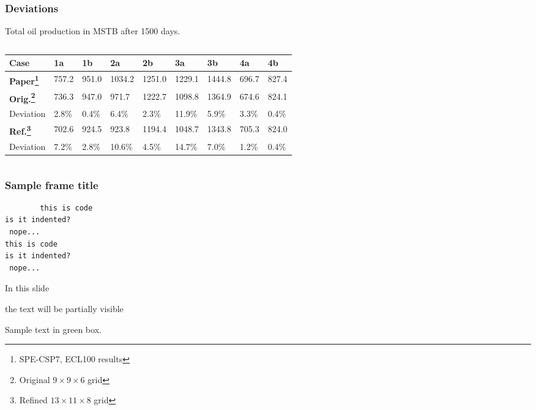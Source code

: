 \documentclass{beamer}
\begin{document}
\begin{frame}
    \frametitle{Deviations}
    Total oil production in MSTB after 1500 days.

    \vspace{2em}
    
    \footnotesize
    \begin{columns}[c]
        \begin{tabular}{lllllllll}
         \toprule
         \textbf{Case}        & 1a     & 1b     & 2a     & 2b     & 3a     & 3b     & 4a     & 4b  \\
         \midrule
         \textbf{Paper\footnote{SPE-CSP7, ECL100 results}} & 757.2  & 951.0  & 1034.2 & 1251.0 & 1229.1 & 1444.8 & 696.7  & 827.4  \\
         \midrule
         \textbf{Orig.\footnote{Original $9\times 9\times 6$ grid}}  & 736.3  & 947.0  & 971.7  & 1222.7 & 1098.8 & 1364.9 & 674.6  & 824.1  \\
         Deviation            & 2.8\%  &  0.4\% &  6.4\% &  2.3\% & 11.9\% &  5.9\% &  3.3\% &  0.4\%   \\
         \midrule
         \textbf{Ref.\footnote{Refined $13\times 11\times 8$ grid}}   & 702.6  & 924.5  & 923.8  & 1194.4 & 1048.7 & 1343.8 & 705.3  & 824.0  \\
         Deviation            & 7.2\%   & 2.8\% &10.6\%  & 4.5\% &14.7\% & 7.0\% & 1.2\% & 0.4\%   \\
         \bottomrule
        \end{tabular}
    \end{columns}
\end{frame}



\begin{frame}[fragile]
	\frametitle{Sample frame title}
	\begin{code}
        \begin{verbatim}
        this is code
is it indented?
 nope...
this is code
is it indented?
 nope...
        \end{verbatim}
    \end{code}
\end{frame}

\begin{frame}
 In this slide \pause
 
 the text will be partially visible
\end{frame}


\begin{frame}
	\begin{remark}
		Sample text in green box.
	\end{remark}
\end{frame}
 
\end{document}
